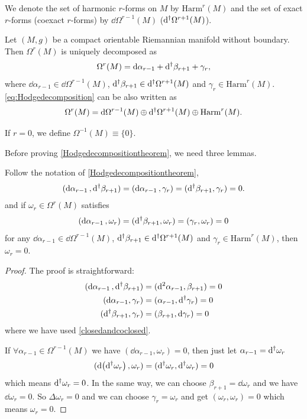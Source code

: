 \documentclass[10pt]{article}
\begin{document}
We denote the set of harmonic $r$-forms on $M$ by $\mathrm{Harm}^r(M)$ and the set of exact $r$-forms (coexact $r$-forms) by $\dd{\Omega^{r-1}(M)}$ ($\mathrm{d}^\dagger\Omega^{r+1}(M)$).
\begin{theorem}\label{Hodgedecompositiontheorem}
    Let $(M,g)$ be a compact orientable Riemannian manifold without boundary.
    Then $\Omega^r(M)$ is uniquely decomposed as
    \begin{align}
        \Omega^r(M)=\dd{\alpha_{r-1}}+\mathrm{d}^\dagger\beta_{r+1}+\gamma_r,\label{eq:Hodgedecomposition}
    \end{align}
    where $\dd{\alpha_{r-1}}\in\dd{\Omega^{r-1}(M)}$, $\mathrm{d}^\dagger\beta_{r+1}\in\mathrm{d}^\dagger\Omega^{r+1}(M)$ and $\gamma_r\in\mathrm{Harm}^r(M)$.
    \eqref{eq:Hodgedecomposition} can be also written as
    \begin{align}
        \Omega^r(M)=\dd{\Omega^{r-1}(M)}\oplus\mathrm{d}^\dagger\Omega^{r+1}(M)\oplus\mathrm{Harm}^r(M).
    \end{align}

    If $r=0$, we define $\Omega^{-1}(M)\equiv\{0\}$.
\end{theorem}
Before proving \cref{Hodgedecompositiontheorem}, we need three lemmas.
\begin{lemma}
    Follow the notation of \cref{Hodgedecompositiontheorem},
    \begin{align}
        (\dd{\alpha_{r-1}},\mathrm{d}^\dagger\beta_{r+1})=(\dd{\alpha_{r-1}},\gamma_r)=(\mathrm{d}^\dagger\beta_{r+1},\gamma_r)=0.
    \end{align}
    and if $\omega_{r}\in\Omega^r(M)$ satisfies
    \begin{align}
        (\dd{\alpha_{r-1}},\omega_r)=(\mathrm{d}^\dagger\beta_{r+1},\omega_r)=(\gamma_r,\omega_r)=0
    \end{align}
    for any $\dd{\alpha_{r-1}}\in\dd{\Omega^{r-1}(M)}$, $\mathrm{d}^\dagger\beta_{r+1}\in\mathrm{d}^\dagger\Omega^{r+1}(M)$ and $\gamma_r\in\mathrm{Harm}^r(M)$, then $\omega_r=0$.
\end{lemma}
\begin{proof}
    The proof is straightforward:
    \begin{align}
        (\dd{\alpha_{r-1}},\mathrm{d}^\dagger\beta_{r+1}) & =(\mathrm{d}^2\alpha_{r-1},\beta_{r+1})=0    \\
        (\dd{\alpha_{r-1},\gamma_r})               & =(\alpha_{r-1},\mathrm{d}^\dagger\gamma_r)=0 \\
        (\mathrm{d}^\dagger\beta_{r+1},\gamma_r)          & =(\beta_{r+1},\dd{\gamma_r})=0
    \end{align}
    where we have used \cref{closedandcoclosed}.
    
    If $\forall\alpha_{r-1}\in\Omega^{r-1}(M)$ we have $(\dd{\alpha_{r-1}},\omega_r)=0$, then just let $\alpha_{r-1}=\mathrm{d}^\dagger\omega_r$
    \begin{align}
        (\dd(\mathrm{d}^\dagger\omega_r),\omega_r)=(\mathrm{d}^\dagger\omega_r,\mathrm{d}^\dagger\omega_r)=0
    \end{align}
    which means $\mathrm{d}^\dagger\omega_r=0$.
    In the same way, we can choose $\beta_{r+1}=\dd{\omega_r}$ and we have $\dd{\omega_r}=0$.
    So $\Delta\omega_r=0$ and we can choose $\gamma_r=\omega_r$ and get $(\omega_r,\omega_r)=0$ which means $\omega_r=0$.
\end{proof}
\end{document}
